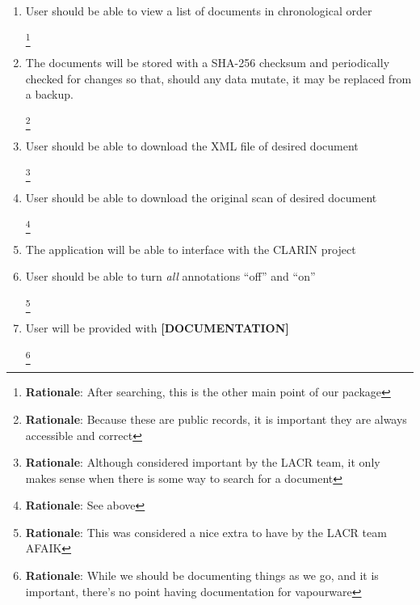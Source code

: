 \documentclass[10pt,a4paper]{report}
\newcommand{\rationale}[1]{
    \footnote{
        \textbf{Rationale}: #1
    }
}
\begin{document}
\begin{enumerate}
            \item User should be able to view a list of documents in chronological order 
            \rationale{After searching, this is the other main point of our package}
            
            \item The documents will be stored with a SHA-256 checksum and periodically checked for changes so that, should any data mutate, it may be replaced from a backup.
            \rationale{Because these are public records, it is important they are always accessible and correct}
            
            \item User should be able to download the XML file of desired document
            \rationale{Although considered important by the LACR team, it only makes sense when there is some way to search for a document}
            
            \item User should be able to download the original scan of desired document
            \rationale{See above}
            
            \item The application will be able to interface with the CLARIN project
            
            \item User should be able to turn \emph{all} annotations “off” and “on”
            \rationale{This was considered a nice extra to have by the LACR team AFAIK}
            
            \item User will be provided with \textbf{[DOCUMENTATION]}
            \rationale{While we should be documenting things as we go, and it is important, there's no point having documentation for vapourware}
        \end{enumerate}
\end{document}
